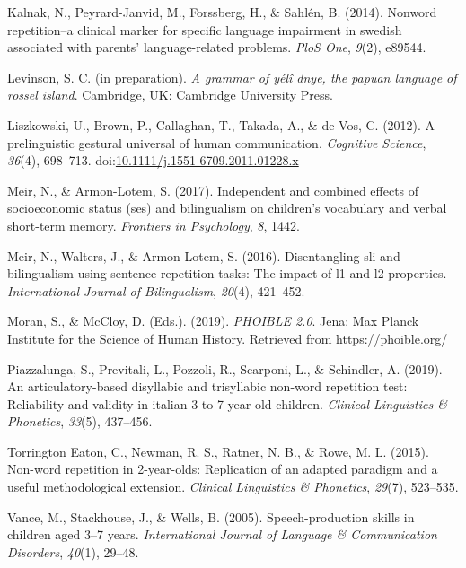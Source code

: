 \documentclass[english,,man,floatsintext]{apa6}
\begin{document}
\hypertarget{ref-kalnak2014nonword}{}
Kalnak, N., Peyrard-Janvid, M., Forssberg, H., \& Sahlén, B. (2014).
Nonword repetition--a clinical marker for specific language impairment
in swedish associated with parents' language-related problems.
\emph{PloS One}, \emph{9}(2), e89544.

\hypertarget{ref-levinsoninprepydgrammar}{}
Levinson, S. C. (in preparation). \emph{A grammar of yélî dnye, the
papuan language of rossel island}. Cambridge, UK: Cambridge University
Press.

\hypertarget{ref-liszkowski2012prelinguistic}{}
Liszkowski, U., Brown, P., Callaghan, T., Takada, A., \& de Vos, C.
(2012). A prelinguistic gestural universal of human communication.
\emph{Cognitive Science}, \emph{36}(4), 698--713.
doi:\href{https://doi.org/10.1111/j.1551-6709.2011.01228.x}{10.1111/j.1551-6709.2011.01228.x}

\hypertarget{ref-meir2017independent}{}
Meir, N., \& Armon-Lotem, S. (2017). Independent and combined effects of
socioeconomic status (ses) and bilingualism on children's vocabulary and
verbal short-term memory. \emph{Frontiers in Psychology}, \emph{8},
1442.

\hypertarget{ref-meir2016disentangling}{}
Meir, N., Walters, J., \& Armon-Lotem, S. (2016). Disentangling sli and
bilingualism using sentence repetition tasks: The impact of l1 and l2
properties. \emph{International Journal of Bilingualism}, \emph{20}(4),
421--452.

\hypertarget{ref-phoible}{}
Moran, S., \& McCloy, D. (Eds.). (2019). \emph{PHOIBLE 2.0}. Jena: Max
Planck Institute for the Science of Human History. Retrieved from
\url{https://phoible.org/}

\hypertarget{ref-piazzalunga2019articulatory}{}
Piazzalunga, S., Previtali, L., Pozzoli, R., Scarponi, L., \& Schindler,
A. (2019). An articulatory-based disyllabic and trisyllabic non-word
repetition test: Reliability and validity in italian 3-to 7-year-old
children. \emph{Clinical Linguistics \& Phonetics}, \emph{33}(5),
437--456.

\hypertarget{ref-torrington2015non}{}
Torrington Eaton, C., Newman, R. S., Ratner, N. B., \& Rowe, M. L.
(2015). Non-word repetition in 2-year-olds: Replication of an adapted
paradigm and a useful methodological extension. \emph{Clinical
Linguistics \& Phonetics}, \emph{29}(7), 523--535.

\hypertarget{ref-vance2005speech}{}
Vance, M., Stackhouse, J., \& Wells, B. (2005). Speech-production skills
in children aged 3--7 years. \emph{International Journal of Language \&
Communication Disorders}, \emph{40}(1), 29--48.
\end{document}
